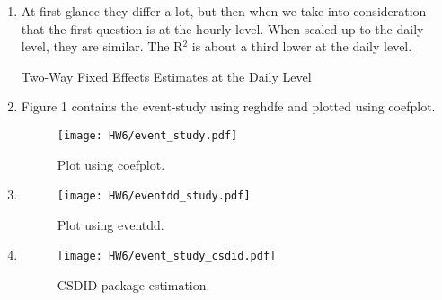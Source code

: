 \documentclass{article}
\begin{document}
\begin{enumerate}

\item At first glance they differ a lot, but then when we take into consideration that the first question is at the hourly level. When scaled up to the daily level, they are similar. The R$^2$ is about a third lower at the daily level.

\begin{table}[H]
    \centering
    \caption{Two-Way Fixed Effects Estimates at the Daily Level}
    \begin{threepart}
        
    \end{threepart}
\end{table}

\item Figure 1 contains the event-study using reghdfe and plotted using coefplot. 
\begin{figure}[H]
    \centering
    \texttt{[image: HW6/event\_study.pdf]}{}
    \caption{Plot using coefplot.}
    \label{fig:enter-label}
\end{figure}

\item 
\begin{figure}[H]
    \centering
    \texttt{[image: HW6/eventdd\_study.pdf]}{}
    \caption{Plot using eventdd.}
    \label{fig:enter-label}
\end{figure}

\item 
\begin{figure}[H]
    \centering
    \texttt{[image: HW6/event\_study\_csdid.pdf]}{}
    \caption{CSDID package estimation.}
    \label{fig:enter-label}
\end{figure}



\end{enumerate} 
   
 
\end{document}
